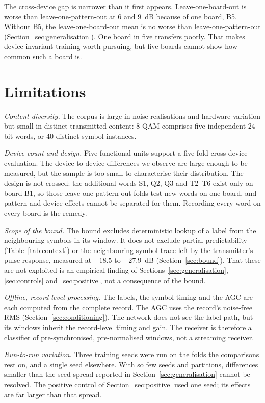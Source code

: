 \documentclass{ieeeaccess}
\begin{document}
The cross-device gap is narrower than it first appears. Leave-one-board-out is
worse than leave-one-pattern-out at $6$ and $9$~dB because of one board, B5.
Without B5, the leave-one-board-out mean is no worse than leave-one-pattern-out
(Section~\ref{sec:generalisation}). One board in five transfers poorly. That
makes device-invariant training worth pursuing, but five boards cannot show
how common such a board is.

\section{Limitations}
\label{sec:limitations}

\emph{Content diversity.} The corpus is large in noise realisations and hardware
variation but small in distinct transmitted content: 8-QAM comprises five
independent 24-bit words, or 40 distinct symbol instances.

\emph{Device count and design.} Five functional units support a five-fold
cross-device evaluation. The device-to-device differences we observe are large
enough to be measured, but the sample is too small to characterise their
distribution. The design is not crossed: the additional words S1, Q2, Q3 and
T2--T6 exist only on board B1, so those leave-one-pattern-out folds test new
words on one board, and pattern and device effects cannot be separated for
them. Recording every word on every board is the remedy.

\emph{Scope of the bound.} The bound excludes deterministic lookup of a label
from the neighbouring symbols in its window. It does not exclude partial
predictability (Table~\ref{tab:context}) or the neighbouring-symbol trace left
by the transmitter's pulse response, measured at $-18.5$ to $-27.9$~dB
(Section~\ref{sec:bound}). That these are not exploited is an empirical finding
of Sections~\ref{sec:generalisation}, \ref{sec:controls}
and~\ref{sec:positive}, not a consequence of the bound.

\emph{Offline, record-level processing.} The labels, the symbol timing and the
AGC are each computed from the complete record. The AGC uses the record's
noise-free RMS (Section~\ref{sec:conditioning}). The network does not see the
label path, but its windows inherit the record-level timing and gain. The
receiver is therefore a classifier of pre-synchronised, pre-normalised
windows, not a streaming receiver.

\emph{Run-to-run variation.} Three training seeds were run on the folds the
comparisons rest on, and a single seed elsewhere. With so few seeds and
partitions, differences smaller than the seed spread reported in
Section~\ref{sec:generalisation} cannot be resolved. The positive control of
Section~\ref{sec:positive} used one seed; its effects are far larger than that
spread.
\end{document}

